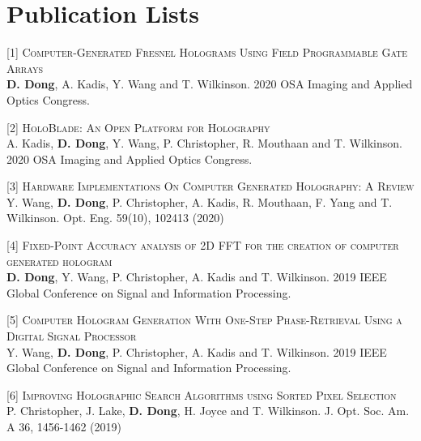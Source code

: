 \documentclass[11pt,a4paper,roman]{moderncv}        %
\begin{document}
\section{Publication Lists}
[1] \textsc{Computer-Generated Fresnel Holograms Using Field Programmable Gate Arrays}\\
\textbf{D. Dong}, A. Kadis, Y. Wang and T. Wilkinson. 2020 OSA Imaging and Applied Optics Congress.

[2] \textsc{HoloBlade: An Open Platform for Holography}\\
A. Kadis, \textbf{D. Dong}, Y. Wang, P. Christopher, R. Mouthaan and T. Wilkinson. 2020 OSA Imaging and Applied Optics Congress.

[3] \textsc{Hardware Implementations On Computer Generated Holography: A Review}\\
Y. Wang, \textbf{D. Dong}, P. Christopher, A. Kadis, R. Mouthaan, F. Yang and T. Wilkinson. Opt. Eng. 59(10), 102413 (2020)

[4] \textsc{Fixed-Point Accuracy analysis of 2D FFT for the creation of computer generated hologram}\\
\textbf{D. Dong}, Y. Wang, P. Christopher, A. Kadis and T. Wilkinson. 2019 IEEE Global Conference on Signal and Information Processing.

[5] \textsc{Computer Hologram Generation With One-Step Phase-Retrieval Using a Digital Signal Processor}\\
Y. Wang, \textbf{D. Dong}, P. Christopher, A. Kadis and T. Wilkinson. 2019 IEEE Global Conference on Signal and Information Processing.


[6] \textsc{Improving Holographic Search Algorithms using Sorted Pixel Selection}\\
P. Christopher, J. Lake, \textbf{D. Dong}, H. Joyce and T. Wilkinson.  J. Opt. Soc. Am. A 36, 1456-1462 (2019)
\end{document}
